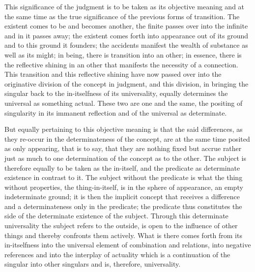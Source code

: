 This significance of the judgment is
to be taken as its objective meaning
and at the same time as the true significance
of the previous forms of transition.
The existent comes to be and becomes another,
the finite passes over into the infinite
and in it passes away;
the existent comes forth into appearance
out of its ground and to this ground it founders;
the accidents manifest the wealth of substance
as well as its might;
in being, there is transition into an other;
in essence, there is the reflective shining
in an other that manifests the necessity of a connection.
This transition and this reflective shining have now
passed over into the originative division
of the concept in judgment,
and this division,
in bringing the singular back to
the in-itselfness of its universality,
equally determines the universal as something actual.
These two are one and the same,
the positing of singularity in its immanent reflection
and of the universal as determinate.

But equally pertaining to this objective meaning is
that the said differences,
as they re-occur in the determinateness of the concept,
are at the same time posited as only appearing,
that is to say, that they are nothing fixed
but accrue rather just as much to one determination
of the concept as to the other.
The subject is therefore equally to be taken as the in-itself,
and the predicate as determinate existence in contrast to it.
The subject without the predicate is what the thing without properties,
the thing-in-itself, is in the sphere of appearance,
an empty indeterminate ground;
it is then the implicit concept that receives
a difference and a determinateness only in the predicate;
the predicate thus constitutes the side of
the determinate existence of the subject.
Through this determinate universality
the subject refers to the outside,
is open to the influence of other things
and thereby confronts them actively.
What is there comes forth from its in-itselfness
into the universal element of combination and relations,
into negative references
and into the interplay of actuality
which is a continuation of the singular
into other singulars
and is, therefore, universality.

